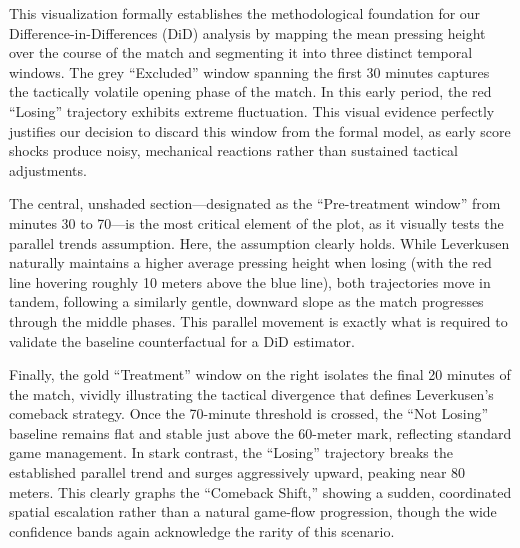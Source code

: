 \documentclass[
]{article}
\begin{document}
This visualization formally establishes the methodological foundation
for our Difference-in-Differences (DiD) analysis by mapping the mean
pressing height over the course of the match and segmenting it into
three distinct temporal windows. The grey ``Excluded'' window spanning
the first 30 minutes captures the tactically volatile opening phase of
the match. In this early period, the red ``Losing'' trajectory exhibits
extreme fluctuation. This visual evidence perfectly justifies our
decision to discard this window from the formal model, as early score
shocks produce noisy, mechanical reactions rather than sustained
tactical adjustments.

The central, unshaded section---designated as the ``Pre-treatment
window'' from minutes 30 to 70---is the most critical element of the
plot, as it visually tests the parallel trends assumption. Here, the
assumption clearly holds. While Leverkusen naturally maintains a higher
average pressing height when losing (with the red line hovering roughly
10 meters above the blue line), both trajectories move in tandem,
following a similarly gentle, downward slope as the match progresses
through the middle phases. This parallel movement is exactly what is
required to validate the baseline counterfactual for a DiD estimator.

Finally, the gold ``Treatment'' window on the right isolates the final
20 minutes of the match, vividly illustrating the tactical divergence
that defines Leverkusen's comeback strategy. Once the 70-minute
threshold is crossed, the ``Not Losing'' baseline remains flat and
stable just above the 60-meter mark, reflecting standard game
management. In stark contrast, the ``Losing'' trajectory breaks the
established parallel trend and surges aggressively upward, peaking near
80 meters. This clearly graphs the ``Comeback Shift,'' showing a sudden,
coordinated spatial escalation rather than a natural game-flow
progression, though the wide confidence bands again acknowledge the
rarity of this scenario.
\end{document}
